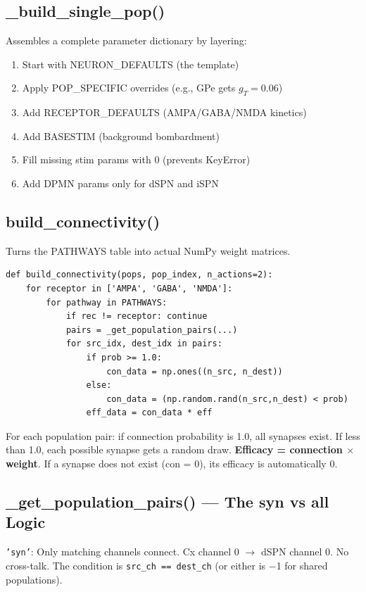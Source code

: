 \documentclass[11pt,a4paper]{article}
\begin{document}
\subsection{\_build\_single\_pop()}

Assembles a complete parameter dictionary by layering:
\begin{enumerate}
    \item Start with NEURON\_DEFAULTS (the template)
    \item Apply POP\_SPECIFIC overrides (e.g., GPe gets $g_T = 0.06$)
    \item Add RECEPTOR\_DEFAULTS (AMPA/GABA/NMDA kinetics)
    \item Add BASESTIM (background bombardment)
    \item Fill missing stim params with 0 (prevents KeyError)
    \item Add DPMN params only for dSPN and iSPN
\end{enumerate}

\subsection{build\_connectivity()}

Turns the PATHWAYS table into actual NumPy weight matrices.

\begin{lstlisting}
def build_connectivity(pops, pop_index, n_actions=2):
    for receptor in ['AMPA', 'GABA', 'NMDA']:
        for pathway in PATHWAYS:
            if rec != receptor: continue
            pairs = _get_population_pairs(...)
            for src_idx, dest_idx in pairs:
                if prob >= 1.0:
                    con_data = np.ones((n_src, n_dest))
                else:
                    con_data = (np.random.rand(n_src,n_dest) < prob)
                eff_data = con_data * eff
\end{lstlisting}

For each population pair: if connection probability is 1.0, all synapses exist. If less than 1.0, each possible synapse gets a random draw. \textbf{Efficacy = connection $\times$ weight}. If a synapse does not exist (con = 0), its efficacy is automatically 0.

\subsection{\_get\_population\_pairs() --- The syn vs all Logic}

\texttt{'syn'}: Only matching channels connect. Cx channel 0 $\rightarrow$ dSPN channel 0. No cross-talk. The condition is \texttt{src\_ch == dest\_ch} (or either is $-$1 for shared populations).
\end{document}
